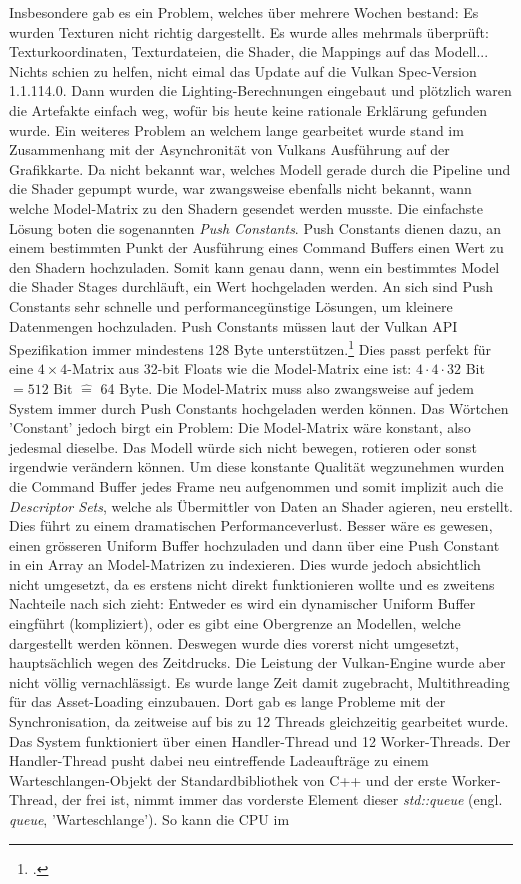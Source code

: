 \documentclass[titlepage, 11pt, a4paper, ngerman]{article}
\begin{document}
Insbesondere gab es ein Problem, welches über mehrere Wochen bestand: Es wurden Texturen nicht richtig dargestellt. Es wurde alles mehrmals überprüft: Texturkoordinaten, Texturdateien, die \gls{Shader}, die Mappings auf das Modell... Nichts schien zu helfen, nicht eimal das Update auf die Vulkan Spec-Version 1.1.114.0. Dann wurden die Lighting-Berechnungen eingebaut und plötzlich waren die Artefakte einfach weg, wofür bis heute keine rationale Erklärung gefunden wurde. Ein weiteres Problem an welchem lange gearbeitet wurde stand im Zusammenhang mit der Asynchronität von Vulkans Ausführung auf der Grafikkarte. Da nicht bekannt war, welches Modell gerade durch die Pipeline und die \gls{Shader} gepumpt wurde, war zwangsweise ebenfalls nicht bekannt, wann welche Model-Matrix zu den \gls{Shader}n gesendet werden musste. Die einfachste Lösung boten die sogenannten \textit{Push Constants}. Push Constants dienen dazu, an einem bestimmten Punkt der Ausführung eines Command Buffers einen Wert zu den \gls{Shader}n hochzuladen. Somit kann genau dann, wenn ein bestimmtes Model die \gls{Shader} Stages durchläuft, ein Wert hochgeladen werden. An sich sind Push Constants sehr schnelle und performancegünstige Lösungen, um kleinere Datenmengen hochzuladen. Push Constants müssen laut der Vulkan \acrshort{API} Spezifikation immer mindestens 128 Byte unterstützen.\footcite{push-constant-vkspec} Dies passt perfekt für eine $4\times4$-Matrix aus 32-bit \glspl{Float} wie die Model-Matrix eine ist: $4 \cdot 4 \cdot 32$ Bit $= 512$ Bit $\widehat{=}$ 64 Byte. Die Model-Matrix muss also zwangsweise auf jedem System immer durch Push Constants hochgeladen werden können. Das Wörtchen 'Constant' jedoch birgt ein Problem: Die Model-Matrix wäre konstant, also jedesmal dieselbe. Das Modell würde sich nicht bewegen, rotieren oder sonst irgendwie verändern können. Um diese konstante Qualität wegzunehmen wurden die Command Buffer jedes \gls{Frame} neu aufgenommen und somit implizit auch die \textit{Descriptor Sets}, welche als Übermittler von Daten an \gls{Shader} agieren, neu erstellt. Dies führt zu einem dramatischen Performanceverlust. Besser wäre es gewesen, einen grösseren Uniform Buffer hochzuladen und dann über eine Push Constant in ein Array an Model-Matrizen zu indexieren. Dies wurde jedoch absichtlich nicht umgesetzt, da es erstens nicht direkt funktionieren wollte und es zweitens Nachteile nach sich zieht: Entweder es wird ein dynamischer Uniform Buffer eingführt (kompliziert), oder es gibt eine Obergrenze an Modellen, welche dargestellt werden können. Deswegen wurde dies vorerst nicht umgesetzt, hauptsächlich wegen des Zeitdrucks. Die Leistung der Vulkan-\gls{Engine} wurde aber nicht völlig vernachlässigt. Es wurde lange Zeit damit zugebracht, \gls{Multithreading} für das Asset-Loading einzubauen. Dort gab es lange Probleme mit der Synchronisation, da zeitweise auf bis zu 12 \glspl{Thread} gleichzeitig gearbeitet wurde. Das System funktioniert über einen Handler-Thread und 12 Worker-\glspl{Thread}. Der Handler-Thread pusht dabei neu eintreffende Ladeaufträge zu einem Warteschlangen-Objekt der Standardbibliothek von C++ und der erste Worker-Thread, der frei ist, nimmt immer das vorderste Element dieser \textit{std::queue} (engl. \textit{queue}, 'Warteschlange'). So kann die \acrshort{CPU} im 
\end{document}
